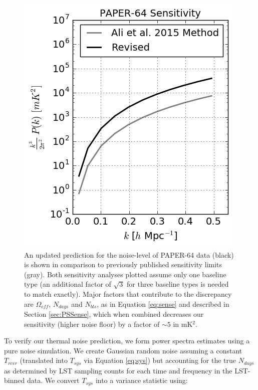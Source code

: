 \documentclass[preprint2,numberedappendix,tighten]{aastex6}  %
\begin{document}
\begin{figure}
	\centering
	\includegraphics[width=\columnwidth]{plots/sense_check.png}
	\caption{An updated prediction for the noise-level of PAPER-64 data (black) is shown in comparison to previously 
published sensitivity limits (gray). Both sensitivity analyses plotted assume only one baseline type (an additional factor of $
\sqrt{3}$ for three baseline types is needed to match  exactly). Major factors that contribute to the discrepancy are $
\Omega_{eff}$, $N_{days}$ and $N_{bls}$, as in Equation \eqref{eq:sense} and described in Section \ref{sec:PSSense}, which when combined decreases our 
sensitivity (higher noise floor) by a factor of $\sim5$ in mK$^{2}$.}
	\label{fig:sense_check}
\end{figure}

To verify our thermal noise prediction, we form power spectra estimates using a pure noise simulation. We create Gaussian 
random noise assuming a constant $T_{rcvr}$ (translated into $T_{sys}$ via Equation \eqref{eq:sys}) but accounting for the true $N_{days}$ as determined 
by LST sampling counts for each time and frequency in the LST-binned data. We convert $T_{sys}$ into a variance statistic 
using:
\end{document}
